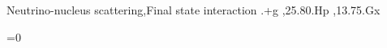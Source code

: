\documentclass[preprint, review, 1p, number, sort&compress]{elsarticle}
\newcommand{\PLsupp}{0}   %
\begin{document}
\begin{frontmatter}
\begin{abstract}
\end{abstract}

\begin{keyword}
Neutrino-nucleus scattering\sep Final state interaction%
.+g \sep 25.80.Hp \sep 13.75.Gx
\end{keyword}

\end{frontmatter}














\ifnum\PLsupp=0
  \clearpage
    
\fi
\end{document}
